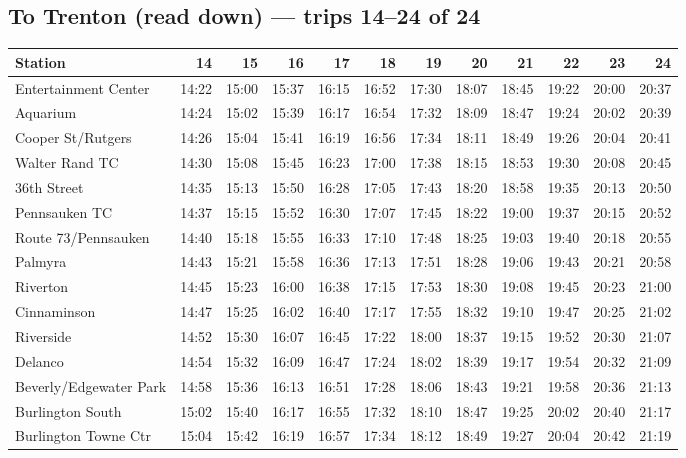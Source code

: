 \subsection*{To Trenton (read down) --- trips 14--24 of 24}
\begin{center}\footnotesize\setlength{\tabcolsep}{3pt}\begin{tabular}{@{}lrrrrrrrrrrr@{}}\toprule
Station & 14 & 15 & 16 & 17 & 18 & 19 & 20 & 21 & 22 & 23 & 24 \\\midrule
Entertainment Center & 14:22 & 15:00 & 15:37 & 16:15 & 16:52 & 17:30 & 18:07 & 18:45 & 19:22 & 20:00 & 20:37 \\
Aquarium & 14:24 & 15:02 & 15:39 & 16:17 & 16:54 & 17:32 & 18:09 & 18:47 & 19:24 & 20:02 & 20:39 \\
Cooper St/Rutgers & 14:26 & 15:04 & 15:41 & 16:19 & 16:56 & 17:34 & 18:11 & 18:49 & 19:26 & 20:04 & 20:41 \\
Walter Rand TC & 14:30 & 15:08 & 15:45 & 16:23 & 17:00 & 17:38 & 18:15 & 18:53 & 19:30 & 20:08 & 20:45 \\
36th Street & 14:35 & 15:13 & 15:50 & 16:28 & 17:05 & 17:43 & 18:20 & 18:58 & 19:35 & 20:13 & 20:50 \\
Pennsauken TC & 14:37 & 15:15 & 15:52 & 16:30 & 17:07 & 17:45 & 18:22 & 19:00 & 19:37 & 20:15 & 20:52 \\
Route 73/Pennsauken & 14:40 & 15:18 & 15:55 & 16:33 & 17:10 & 17:48 & 18:25 & 19:03 & 19:40 & 20:18 & 20:55 \\
Palmyra & 14:43 & 15:21 & 15:58 & 16:36 & 17:13 & 17:51 & 18:28 & 19:06 & 19:43 & 20:21 & 20:58 \\
Riverton & 14:45 & 15:23 & 16:00 & 16:38 & 17:15 & 17:53 & 18:30 & 19:08 & 19:45 & 20:23 & 21:00 \\
Cinnaminson & 14:47 & 15:25 & 16:02 & 16:40 & 17:17 & 17:55 & 18:32 & 19:10 & 19:47 & 20:25 & 21:02 \\
Riverside & 14:52 & 15:30 & 16:07 & 16:45 & 17:22 & 18:00 & 18:37 & 19:15 & 19:52 & 20:30 & 21:07 \\
Delanco & 14:54 & 15:32 & 16:09 & 16:47 & 17:24 & 18:02 & 18:39 & 19:17 & 19:54 & 20:32 & 21:09 \\
Beverly/Edgewater Park & 14:58 & 15:36 & 16:13 & 16:51 & 17:28 & 18:06 & 18:43 & 19:21 & 19:58 & 20:36 & 21:13 \\
Burlington South & 15:02 & 15:40 & 16:17 & 16:55 & 17:32 & 18:10 & 18:47 & 19:25 & 20:02 & 20:40 & 21:17 \\
Burlington Towne Ctr & 15:04 & 15:42 & 16:19 & 16:57 & 17:34 & 18:12 & 18:49 & 19:27 & 20:04 & 20:42 & 21:19 \\

\end{tabular}
\end{center}
